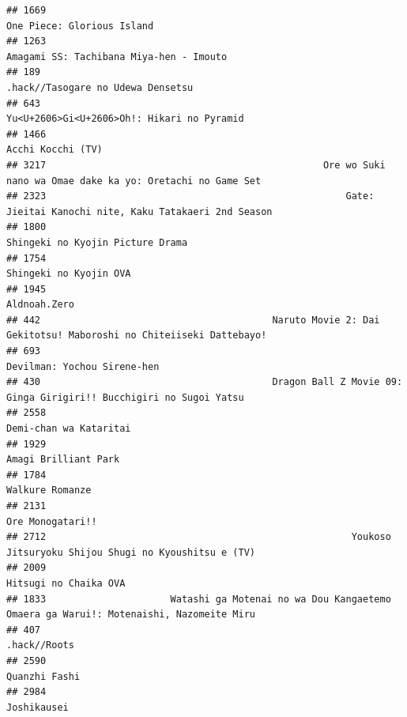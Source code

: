 \documentclass[
]{article}
\begin{document}
\begin{verbatim}
## 1669                                                                                One Piece: Glorious Island
## 1263                                                                   Amagami SS: Tachibana Miya-hen - Imouto
## 189                                                                          .hack//Tasogare no Udewa Densetsu
## 643                                                                 Yu<U+2606>Gi<U+2606>Oh!: Hikari no Pyramid
## 1466                                                                                         Acchi Kocchi (TV)
## 3217                                                 Ore wo Suki nano wa Omae dake ka yo: Oretachi no Game Set
## 2323                                                     Gate: Jieitai Kanochi nite, Kaku Tatakaeri 2nd Season
## 1800                                                                          Shingeki no Kyojin Picture Drama
## 1754                                                                                    Shingeki no Kyojin OVA
## 1945                                                                                              Aldnoah.Zero
## 442                                         Naruto Movie 2: Dai Gekitotsu! Maboroshi no Chiteiiseki Dattebayo!
## 693                                                                                Devilman: Yochou Sirene-hen
## 430                                         Dragon Ball Z Movie 09: Ginga Girigiri!! Bucchigiri no Sugoi Yatsu
## 2558                                                                                    Demi-chan wa Kataritai
## 1929                                                                                      Amagi Brilliant Park
## 1784                                                                                           Walkure Romanze
## 2131                                                                                          Ore Monogatari!!
## 2712                                                      Youkoso Jitsuryoku Shijou Shugi no Kyoushitsu e (TV)
## 2009                                                                                     Hitsugi no Chaika OVA
## 1833                      Watashi ga Motenai no wa Dou Kangaetemo Omaera ga Warui!: Motenaishi, Nazomeite Miru
## 407                                                                                               .hack//Roots
## 2590                                                                                             Quanzhi Fashi
## 2984                                                                                               Joshikausei

\end{verbatim}
\end{document}
